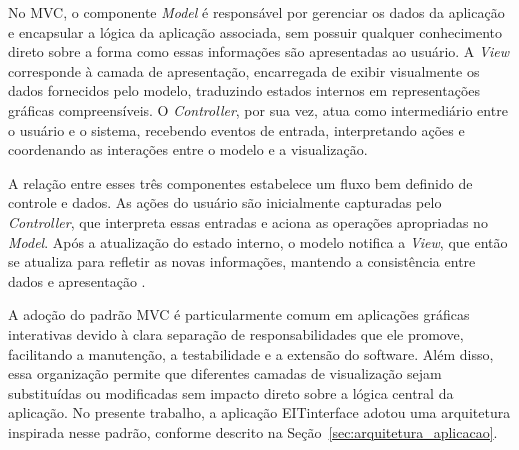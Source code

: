 No MVC, o componente \textit{Model} é responsável por gerenciar os dados da aplicação e encapsular a lógica da aplicação associada, sem possuir qualquer conhecimento direto sobre a forma como essas informações são apresentadas ao usuário. A \textit{View} corresponde à camada de apresentação, encarregada de exibir visualmente os dados fornecidos pelo modelo, traduzindo estados internos em representações gráficas compreensíveis. O \textit{Controller}, por sua vez, atua como intermediário entre o usuário e o sistema, recebendo eventos de entrada, interpretando ações e coordenando as interações entre o modelo e a visualização.

A relação entre esses três componentes estabelece um fluxo bem definido de controle e dados. As ações do usuário são inicialmente capturadas pelo \textit{Controller}, que interpreta essas entradas e aciona as operações apropriadas no \textit{Model}. Após a atualização do estado interno, o modelo notifica a \textit{View}, que então se atualiza para refletir as novas informações, mantendo a consistência entre dados e apresentação \cite{GoF1994}. 

A adoção do padrão MVC é particularmente comum em aplicações gráficas interativas devido à clara separação de responsabilidades que ele promove, facilitando a manutenção, a testabilidade e a extensão do software. Além disso, essa organização permite que diferentes camadas de visualização sejam substituídas ou modificadas sem impacto direto sobre a lógica central da aplicação. No presente trabalho, a aplicação EITinterface adotou uma arquitetura inspirada nesse padrão, conforme descrito na Seção~\ref{sec:arquitetura_aplicacao}.